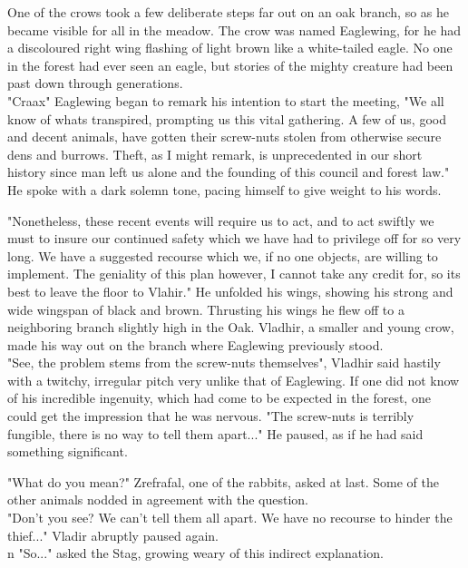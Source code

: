 \documentclass[smalldemyvopaper,11pt,twoside,onecolumn,openright,extrafontsizes]{memoir}
\begin{document}
One of the crows took a few deliberate steps far out on an oak branch, so as he became visible for all in the meadow. The crow was named Eaglewing, for he had a discoloured right wing flashing of light brown like a white-tailed eagle. No one in the forest had ever seen an eagle, but stories of the mighty creature had been past down through generations.\\

"Craax" Eaglewing began to remark his intention to start the meeting, "We all know of whats transpired, prompting us this vital gathering. A few of us, good and decent animals, have gotten their screw-nuts stolen from otherwise secure dens and burrows. Theft, as I might remark, is unprecedented in our short history since man left us alone and the founding of this council and forest law." He spoke with a dark solemn tone, pacing himself to give weight to his words.

"Nonetheless, these recent events will require us to act, and to act swiftly we must to insure our continued safety which we have had to privilege off for so very long. We have a suggested recourse which we, if no one objects, are willing to implement. The geniality of this plan however, I cannot take any credit for, so its best to leave the floor to Vlahir." He unfolded his wings, showing his strong and wide wingspan of black and brown. Thrusting his wings he flew off to a neighboring branch slightly high in the Oak. Vladhir, a smaller and young crow, made his way out on the branch where Eaglewing previously stood.\\

"See, the problem stems from the screw-nuts themselves", Vladhir said hastily with a twitchy, irregular pitch very unlike that of Eaglewing. If one did not know of his incredible ingenuity, which had come to be expected in the forest, one could get the impression that he was nervous. "The screw-nuts is terribly fungible, there is no way to tell them apart..." He paused, as if he had said something significant.  

"What do you mean?" Zrefrafal, one of the rabbits, asked at last. Some of the other animals nodded in agreement with the question.\\

"Don't you see? We can't tell them all apart. We have no recourse to hinder the thief..." Vladir abruptly paused again.\\
n
"So..." asked the Stag, growing weary of this indirect explanation.\\
\end{document}
